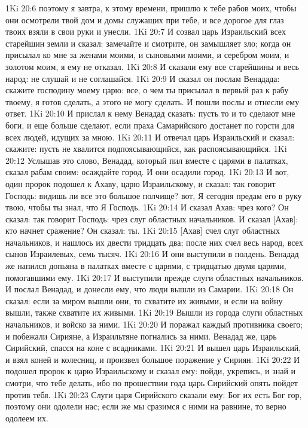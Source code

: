 1Ki 20:6  поэтому я завтра, к этому времени, пришлю к тебе рабов моих, чтобы они осмотрели твой дом и домы служащих при тебе, и все дорогое для глаз твоих взяли в свои руки и унесли.
1Ki 20:7  И созвал царь Израильский всех старейшин земли и сказал: замечайте и смотрите, он замышляет зло; когда он присылал ко мне за женами моими, и сыновьями моими, и серебром моим, и золотом моим, я ему не отказал.
1Ki 20:8  И сказали ему все старейшины и весь народ: не слушай и не соглашайся.
1Ki 20:9  И сказал он послам Венадада: скажите господину моему царю: все, о чем ты присылал в первый раз к рабу твоему, я готов сделать, а этого не могу сделать. И пошли послы и отнесли ему ответ.
1Ki 20:10  И прислал к нему Венадад сказать: пусть то и то сделают мне боги, и еще больше сделают, если праха Самарийского достанет по горсти для всех людей, идущих за мною.
1Ki 20:11  И отвечал царь Израильский и сказал: скажите: пусть не хвалится подпоясывающийся, как распоясывающийся.
1Ki 20:12  Услышав это слово, Венадад, который пил вместе с царями в палатках, сказал рабам своим: осаждайте город. И они осадили город.
1Ki 20:13  И вот, один пророк подошел к Ахаву, царю Израильскому, и сказал: так говорит Господь: видишь ли все это большое полчище? вот, Я сегодня предам его в руку твою, чтобы ты знал, что Я Господь.
1Ki 20:14  И сказал Ахав: чрез кого? Он сказал: так говорит Господь: чрез слуг областных начальников. И сказал [Ахав]: кто начнет сражение? Он сказал: ты.
1Ki 20:15  [Ахав] счел слуг областных начальников, и нашлось их двести тридцать два; после них счел весь народ, всех сынов Израилевых, семь тысяч.
1Ki 20:16  И они выступили в полдень. Венадад же напился допьяна в палатках вместе с царями, с тридцатью двумя царями, помогавшими ему.
1Ki 20:17  И выступили прежде слуги областных начальников. И послал Венадад, и донесли ему, что люди вышли из Самарии.
1Ki 20:18  Он сказал: если за миром вышли они, то схватите их живыми, и если на войну вышли, также схватите их живыми.
1Ki 20:19  Вышли из города слуги областных начальников, и войско за ними.
1Ki 20:20  И поражал каждый противника своего; и побежали Сирияне, а Израильтяне погнались за ними. Венадад же, царь Сирийский, спасся на коне с всадниками.
1Ki 20:21  И вышел царь Израильский, и взял коней и колесниц, и произвел большое поражение у Сириян.
1Ki 20:22  И подошел пророк к царю Израильскому и сказал ему: пойди, укрепись, и знай и смотри, что тебе делать, ибо по прошествии года царь Сирийский опять пойдет против тебя.
1Ki 20:23  Слуги царя Сирийского сказали ему: Бог их есть Бог гор, поэтому они одолели нас; если же мы сразимся с ними на равнине, то верно одолеем их.
